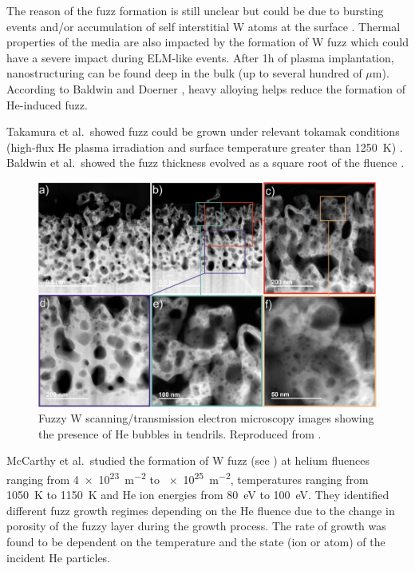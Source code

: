 The reason of the \gls{fuzz} formation is still unclear but could be due to bursting events and/or accumulation of self interstitial W atoms at the surface .
Thermal properties of the media are also impacted by the formation of W \gls{fuzz}  which could have a severe impact during ELM-like events.
After 1h of \gls{plasma} implantation, nanostructuring can be found deep in the bulk (up to several hundred of $\mu$m).
According to Baldwin and Doerner , heavy alloying helps reduce the formation of He-induced \gls{fuzz}.

Takamura et al.\ showed \gls{fuzz} could be grown under relevant \gls{tokamak} conditions (high-flux He \gls{plasma} irradiation and surface temperature greater than \SI{1250}{K}) .
Baldwin et al.\ showed the \gls{fuzz} thickness evolved as a square root of the \gls{fluence} \cite{baldwin_effects_2009}.

\begin{figure} [h!]
    \centering
    \includegraphics[width=\linewidth]{Figures/Chapter1/fuzz_mccarthy.jpg}
    \caption{Fuzzy W scanning/transmission electron microscopy images showing the presence of He bubbles in tendrils. Reproduced from \cite{mccarthy_enhanced_2020}.}
\end{figure}

McCarthy et al.\ studied the formation of W \gls{fuzz} (see ) at helium fluences ranging from \SI{4e23}{m^{-2}} to \SI{e25}{m^{-2}}, temperatures ranging from \SI{1050}{K} to \SI{1150}{K} and He ion energies from \SI{80}{eV} to \SI{100}{eV}.
They identified different \gls{fuzz} growth regimes depending on the He \gls{fluence} due to the change in porosity of the fuzzy layer during the growth process.
The rate of growth was found to be dependent on the temperature and the state (ion or atom) of the incident He particles.


